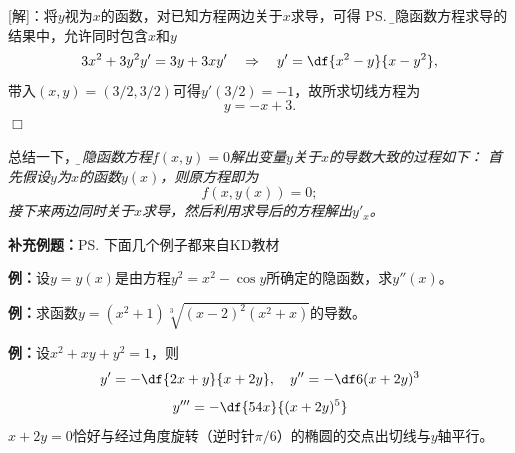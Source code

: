 [解]：将$y$视为$x$的函数，对已知方程两边关于$x$求导，可得
\ps{\b 在隐函数方程求导的结果中，允许同时包含$x$和$y$}
$$3x^2+3y^2y'=3y+3xy'\quad\Rightarrow\quad
y'=\df{x^2-y}{x-y^2},$$
带入$(x,y)=(3/2,3/2)$可得$y'(3/2)=-1$，故所求切线方程为
$$y=-x+3.$$
\hfill$\Box$

总结一下，{\it\b 由隐函数方程$f(x,y)=0$解出变量$y$关于$x$的导数大致的过程如下：
首先假设$y$为$x$的函数$y(x)$，则原方程即为
$$f(x,y(x))=0;$$
接下来两边同时关于$x$求导，然后利用求导后的方程解出$y'_x$。}

{\bf 补充例题：}\ps{下面几个例子都来自KD教材}

{\bf 例：}设$y=y(x)$是由方程$y^2=x^2-\cos y$所确定的隐函数，求$y''(x)$。

\begin{center}
\end{center}

{\bf 例：}求函数$y=(x^2+1)\sqrt[3]{(x-2)^2(x^2+x)}$的导数。

{\bf 例：}设$x^2+xy+y^2=1$，则
$$y'=-\df{2x+y}{x+2y},\quad y''=-\df6{(x+2y)^3}$$
$$y'''=-\df{54x}{(x+2y)^5}$$
$x+2y=0$恰好与经过角度旋转（逆时针$\pi/6$）的椭圆的交点出切线与$y$轴平行。

